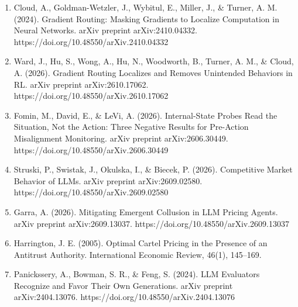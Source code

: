 \documentclass[11pt,letterpaper]{article}
\newenvironment{instr}{\par\itshape\setlength{\parindent}{0pt}\raggedright}{\par}
\begin{document}
\begin{instr}
\begin{enumerate}[leftmargin=0.5in, labelwidth=0.25in, labelsep=0pt, align=left, label=\arabic*., ref=\arabic*, font=\upshape, itemsep=0pt, parsep=0pt, topsep=0pt]
\item \upshape Cloud, A., Goldman-Wetzler, J., Wybitul, E., Miller, J., \& Turner, A. M. (2024). Gradient Routing: Masking Gradients to Localize Computation in Neural Networks. arXiv preprint arXiv:2410.04332. https://doi.org/10.48550/arXiv.2410.04332\label{ref:gradrouting}
\item \upshape Ward, J., Hu, S., Wong, A., Hu, N., Woodworth, B., Turner, A. M., \& Cloud, A. (2026). Gradient Routing Localizes and Removes Unintended Behaviors in RL. arXiv preprint arXiv:2610.17062. https://doi.org/10.48550/arXiv.2610.17062\label{ref:graft}
\item \upshape Fomin, M., David, E., \& LeVi, A. (2026). Internal-State Probes Read the Situation, Not the Action: Three Negative Results for Pre-Action Misalignment Monitoring. arXiv preprint arXiv:2606.30449. https://doi.org/10.48550/arXiv.2606.30449\label{ref:probes}
\item \upshape Struski, P., Swistak, J., Okulska, I., \& Biecek, P. (2026). Competitive Market Behavior of LLMs. arXiv preprint arXiv:2609.02580. https://doi.org/10.48550/arXiv.2609.02580\label{ref:struski}
\item \upshape Garra, A. (2026). Mitigating Emergent Collusion in LLM Pricing Agents. arXiv preprint arXiv:2609.13037. https://doi.org/10.48550/arXiv.2609.13037\label{ref:garra}
\item \upshape Harrington, J. E. (2005). Optimal Cartel Pricing in the Presence of an Antitrust Authority. International Economic Review, 46(1), 145--169.\label{ref:harrington}
\item \upshape Panickssery, A., Bowman, S. R., \& Feng, S. (2024). LLM Evaluators Recognize and Favor Their Own Generations. arXiv preprint arXiv:2404.13076. https://doi.org/10.48550/arXiv.2404.13076\label{ref:selfpref}
\end{enumerate}
\end{instr}
\end{document}
